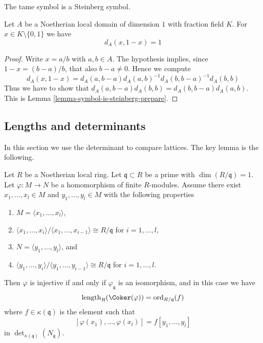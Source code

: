 \noindent
The tame symbol is a Steinberg symbol.

\begin{lemma}
\label{lemma-symbol-is-steinberg}
Let $A$ be a Noetherian local domain of dimension $1$
with fraction field $K$. For $x \in K \setminus \{0, 1\}$
we have
$$
d_A(x, 1 -x) = 1
$$
\end{lemma}

\begin{proof}
Write $x = a/b$ with $a, b \in A$.
The hypothesis implies, since $1 - x = (b - a)/b$,
that also $b - a \not = 0$. Hence we compute
$$
d_A(x, 1 - x)
=
d_A(a, b - a)d_A(a, b)^{-1}d_A(b, b - a)^{-1}d_A(b, b)
$$
Thus we have to show that
$d_A(a, b - a) d_A(b, b) = d_A(b, b - a) d_A(a, b)$.
This is Lemma \ref{lemma-symbol-is-steinberg-prepare}.
\end{proof}










\subsection{Lengths and determinants}
\label{subsection-length-determinant}

\noindent
In this section we use the determinant to compare lattices.
The key lemma is the following.

\begin{lemma}
\label{lemma-key-lemma}
Let $R$ be a Noetherian local ring.
Let $\mathfrak q \subset R$ be a prime with $\dim(R/\mathfrak q) = 1$.
Let $\varphi : M \to N$ be a homomorphism of finite $R$-modules.
Assume there exist $x_1, \ldots, x_l \in M$ and $y_1, \ldots, y_l \in M$
with the following properties
\begin{enumerate}
\item $M = \langle x_1, \ldots, x_l\rangle$,
\item $\langle x_1, \ldots, x_i\rangle / \langle x_1, \ldots, x_{i - 1}\rangle
\cong R/\mathfrak q$ for $i = 1, \ldots, l$,
\item $N = \langle y_1, \ldots, y_l\rangle$, and
\item $\langle y_1, \ldots, y_i\rangle / \langle y_1, \ldots, y_{i - 1}\rangle
\cong R/\mathfrak q$ for $i = 1, \ldots, l$.
\end{enumerate}
Then $\varphi$ is injective if and only if $\varphi_{\mathfrak q}$ is an
isomorphism, and in this case we have
$$
\text{length}_R(\Coker(\varphi)) = \text{ord}_{R/\mathfrak q}(f)
$$
where $f \in \kappa(\mathfrak q)$ is the element such that
$$
[\varphi(x_1), \ldots, \varphi(x_l)] = f [y_1, \ldots, y_l]
$$
in $\det_{\kappa(\mathfrak q)}(N_{\mathfrak q})$.
\end{lemma}

